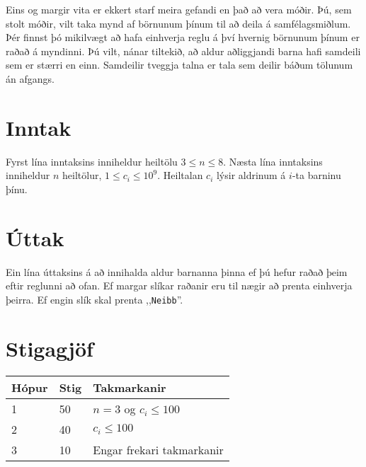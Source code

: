 %
Eins og margir vita er ekkert starf meira gefandi en það að vera móðir.
Þú, sem stolt móðir, vilt taka mynd af börnunum þínum til að deila á samfélagsmiðlum.
Þér finnst þó mikilvægt að hafa einhverja reglu á því hvernig börnunum þínum er raðað á myndinni.
Þú vilt, nánar tiltekið, að aldur aðliggjandi barna hafi samdeili sem er stærri en einn.
Samdeilir tveggja talna er tala sem deilir báðum tölunum án afgangs.

\section*{Inntak}
Fyrst lína inntaksins inniheldur heiltölu $3 \leq n \leq 8$.
Næsta lína inntaksins inniheldur $n$ heiltölur, $1 \leq c_i \leq 10^9$.
Heiltalan $c_i$ lýsir aldrinum á $i$-ta barninu þínu.

\section*{Úttak}
Ein lína úttaksins á að innihalda aldur barnanna þinna ef þú hefur raðað þeim eftir reglunni að ofan.
Ef margar slíkar raðanir eru til nægir að prenta einhverja þeirra.
Ef engin slík skal prenta ,,\texttt{Neibb}''.

\section*{Stigagjöf}
\begin{tabular}{|l|l|l|}
\hline
Hópur & Stig & Takmarkanir \\ \hline
1     & 50   & $n = 3$ og $c_i \leq 100$ \\ \hline
2     & 40   & $c_i \leq 100$ \\ \hline
3     & 10   & Engar frekari takmarkanir\\ \hline
\end{tabular}

